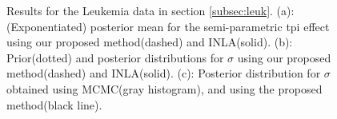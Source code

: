 \documentclass[ba]{imsart}
\begin{document}
\begin{figure}[ht]
\centering
{}
\caption{Results for the Leukemia data in section \ref{subsec:leuk}. (a): (Exponentiated) posterior mean for the semi-parametric tpi effect using our proposed method(dashed) and INLA(solid). (b): Prior(dotted) and posterior distributions for $\sigma$ using our proposed method(dashed) and INLA(solid). (c): Posterior distribution for $\sigma$ obtained using MCMC(gray histogram), and using the proposed method(black line).}
\label{fig:leuk}
\end{figure}
\end{document}
